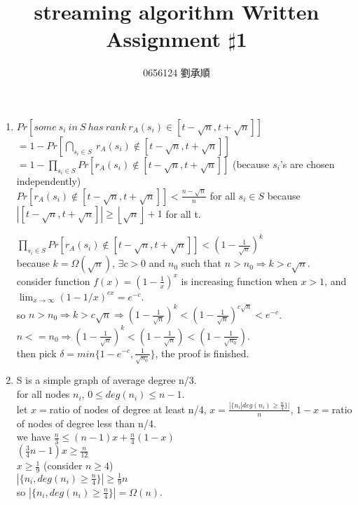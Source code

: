 \documentclass[11pt]{article}
\title{streaming algorithm Written Assignment $\sharp$1 }
\author{0656124 劉承順}
\date{} %
\begin{document}
\maketitle





\begin{enumerate}
\item $Pr[some\ s_i\ 
in\ S\ has\ rank\ r_A(s_i) \in [t −
\sqrt{n}
, t +
\sqrt{n}]]$\\
$ = 1-Pr[\bigcap_{s_i\in S}\ r_A(s_i) \notin [t −
\sqrt{n}
, t +
\sqrt{n}]]$\\
$ = 1-\prod_{s_i\in S}Pr[r_A(s_i) \notin [t −
\sqrt{n}
, t +
\sqrt{n}]]$ (because $s_i$'s are chosen independently)\\
$Pr[r_A(s_i) \notin [t −
\sqrt{n}
, t +
\sqrt{n}]]<\frac{n-\sqrt{n}}{n}$ for all $s_i\in S$ because $|[t −
\sqrt{n}
, t +
\sqrt{n}]|\geq\left \lfloor \sqrt{n} \right \rfloor+1$ for all t.

$\prod_{s_i\in S}Pr[r_A(s_i) \notin [t −
\sqrt{n}
, t +
\sqrt{n}]]<(1-\frac{1}{\sqrt{n}})^k$\\
because $k=\Omega(\sqrt{n})$, $\exists c>0$ and $n_0$ such that $n>n_0\Rightarrow k>c\sqrt{n}$.\\
consider function $f(x)=(1-\frac{1}{x})^x$ is increasing function when $x>1$, and 
$\lim_{x\rightarrow\infty} (1 - 1/x)^{cx} = e^{-c}$.\\
so $n>n_0\Rightarrow k>c\sqrt{n} \Rightarrow (1-\frac{1}{\sqrt{n}})^k<(1-\frac{1}{\sqrt{n}})^{c\sqrt{n}}<e^{-c}$.\\
$n<=n_0\Rightarrow (1-\frac{1}{\sqrt{n}})^k<(1-\frac{1}{\sqrt{n}})<(1-\frac{1}{\sqrt{n_0}})$.\\
then pick $\delta=min\{1-e^{-c},\frac{1}{\sqrt{n_0}}\}$, the proof is finished.\\





\item 
S is a simple graph of average degree n/3.\\
for all nodes $n_i$, $0\leq deg(n_i)\leq n-1$.\\
let $x=$ratio of nodes of degree at least n/4, $x=\frac{|\{n_i|deg(n_i)\geq\frac{n}{4}\}|}{n}$,
 $1-x=$ratio of nodes of degree less than n/4.\\
we have $\frac{n}{3}\leq(n-1)x+\frac{n}{4}(1-x)$\\
$(\frac{3}{4}n-1)x\geq\frac{n}{12}$\\
$x\geq\frac{1}{9}$ (consider $n\geq4$)\\
$|\{n_i,deg(n_i)\geq\frac{n}{4}\}|\geq\frac{1}{9}n$\\
so $|\{n_i,deg(n_i)\geq\frac{n}{4}\}| = \Omega(n)$.










\end{enumerate}
\end{document}
